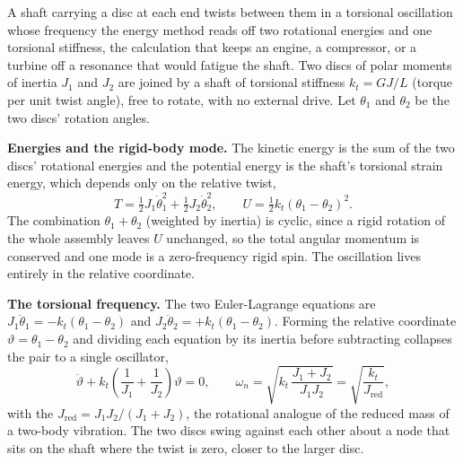 A shaft carrying a disc at each end twists between them in a torsional
oscillation whose frequency the energy method reads off two rotational
energies and one torsional stiffness, the calculation that keeps an engine,
a compressor, or a turbine off a resonance that would fatigue the shaft. Two
discs of polar moments of inertia $J_1$ and $J_2$ are joined by a shaft of
torsional stiffness $k_t = GJ/L$ (torque per unit twist angle), free to
rotate, with no external drive. Let $\theta_1$ and $\theta_2$ be the two
discs' rotation angles.

\textbf{Energies and the rigid-body mode.} The kinetic energy is the sum of
the two discs' rotational energies and the potential energy is the shaft's
torsional strain energy, which depends only on the relative twist,
\[
T = \tfrac12 J_1\dot\theta_1^2 + \tfrac12 J_2\dot\theta_2^2,
\qquad
U = \tfrac12 k_t(\theta_1 - \theta_2)^2.
\]
The combination $\theta_1 + \theta_2$ (weighted by inertia) is cyclic,
since a rigid rotation of the whole assembly leaves $U$ unchanged, so the
total angular momentum is conserved and one mode is a zero-frequency rigid
spin. The oscillation lives entirely in the relative coordinate.

\textbf{The torsional frequency.} The two Euler-Lagrange equations are
$J_1\ddot\theta_1 = -k_t(\theta_1 - \theta_2)$ and $J_2\ddot\theta_2 =
+k_t(\theta_1 - \theta_2)$. Forming the relative coordinate $\vartheta =
\theta_1 - \theta_2$ and dividing each equation by its inertia before
subtracting collapses the pair to a single oscillator,
\[
\ddot\vartheta + k_t\!\left(\frac{1}{J_1} + \frac{1}{J_2}\right)\vartheta
= 0,
\qquad
\omega_n = \sqrt{k_t\,\frac{J_1 + J_2}{J_1 J_2}}
= \sqrt{\frac{k_t}{J_{\mathrm{red}}}},
\]
with the  $J_{\mathrm{red}} = J_1 J_2/(J_1 + J_2)$,
the rotational analogue of the reduced mass of a two-body vibration. The two
discs swing against each other about a node that sits on the shaft where the
twist is zero, closer to the larger disc.

